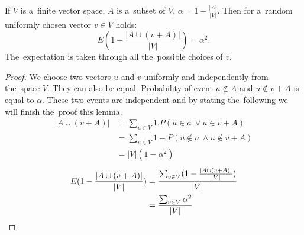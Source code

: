 \begin{lemma}
\label{lemma-choose-random-vector}
If $V$ is a~finite vector space, $A$ is a~subset of $V$, $\alpha = 1 - \frac{|A|}{|V|}$. Then for a~random uniformly chosen vector $v \in V$ holds:
\begin{displaymath}
E (1 - \frac{|A \cup (v + A)|}{|V|}) = \alpha^2 \textit{.}
\end{displaymath}
The~expectation is taken through all the~possible choices of $v$.
\end{lemma}
\begin{proof}
We choose two vectors $u$ and $v$ uniformly and independently from the~space $V$. They can also be equal. Probability of event $u \notin A$ and $u \notin v + A$ is equal to $\alpha$. These two events are independent and by stating the~following we will finish the~proof this lemma.
\begin{displaymath}
\begin{split}
|A \cup (v + A)| 
	& = \sum_{u \in V} 1 . P(u \in a~\vee u \in v + A) \\ 
	& = \sum_{u \in V} 1 - P(u \notin a~\wedge u \notin v + A) \\ 
	& = |V| (1 - \alpha ^ 2)
\end{split}
\end{displaymath}
\begin{displaymath}
\begin{split}
E (1 - \frac{|A \cup (v + A)|}{|V|}) 
	& = \frac{\sum\displaylimits_{v \in V}(1 - \frac{|A \cup (v + A)|}{|V|})}{|V|} \\
	& = \frac{\sum\displaylimits_{v \in V}\alpha ^ 2}{|V|}
\end{split}
\end{displaymath}
\end{proof}

